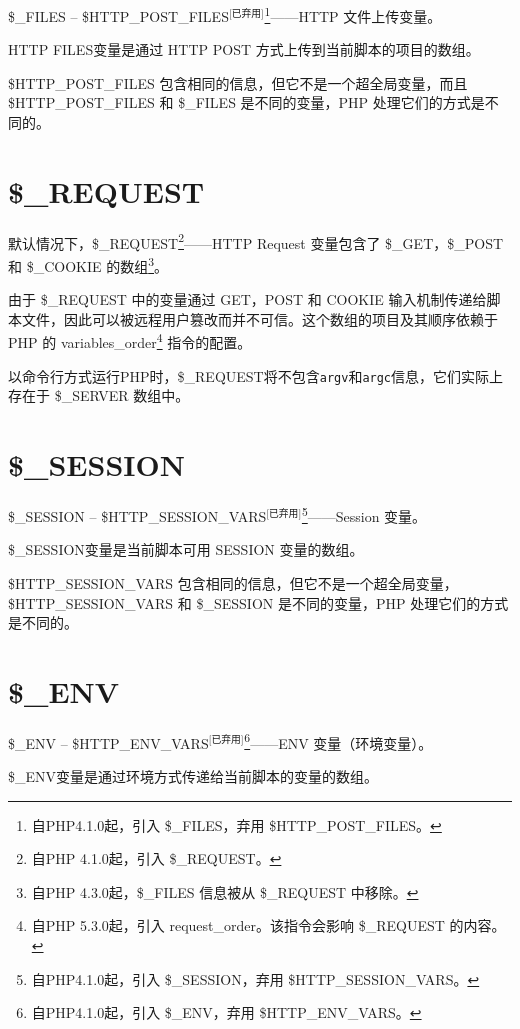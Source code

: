 \$\_FILES -- \$HTTP\_POST\_FILES$^{\text{[已弃用]}}$\footnote{自PHP4.1.0起，引入 \$\_FILES，弃用 \$HTTP\_POST\_FILES。}——HTTP 文件上传变量。

HTTP FILES变量是通过 HTTP POST 方式上传到当前脚本的项目的数组。

\$HTTP\_POST\_FILES 包含相同的信息，但它不是一个超全局变量，而且\$HTTP\_POST\_FILES 和 \$\_FILES 是不同的变量，PHP 处理它们的方式是不同的。


\section{\$\_REQUEST}


默认情况下，\$\_REQUEST\footnote{自PHP 4.1.0起，引入 \$\_REQUEST。}——HTTP Request 变量包含了 \$\_GET，\$\_POST 和 \$\_COOKIE 的数组\footnote{自PHP 4.3.0起，\$\_FILES 信息被从 \$\_REQUEST 中移除。}。

由于 \$\_REQUEST 中的变量通过 GET，POST 和 COOKIE 输入机制传递给脚本文件，因此可以被远程用户篡改而并不可信。这个数组的项目及其顺序依赖于 PHP 的 variables\_order\footnote{自PHP 5.3.0起，引入 request\_order。该指令会影响 \$\_REQUEST 的内容。} 指令的配置。

以命令行方式运行PHP时，\$\_REQUEST将不包含\texttt{argv}和\texttt{argc}信息，它们实际上存在于 \$\_SERVER 数组中。




\section{\$\_SESSION}


\$\_SESSION -- \$HTTP\_SESSION\_VARS$^{\text{[已弃用]}}$\footnote{自PHP4.1.0起，引入 \$\_SESSION，弃用 \$HTTP\_SESSION\_VARS。}——Session 变量。


\$\_SESSION变量是当前脚本可用 SESSION 变量的数组。

\$HTTP\_SESSION\_VARS 包含相同的信息，但它不是一个超全局变量，\$HTTP\_SESSION\_VARS 和 \$\_SESSION 是不同的变量，PHP 处理它们的方式是不同的。


\section{\$\_ENV}


\$\_ENV -- \$HTTP\_ENV\_VARS$^{\text{[已弃用]}}$\footnote{自PHP4.1.0起，引入 \$\_ENV，弃用 \$HTTP\_ENV\_VARS。}——ENV 变量（环境变量）。


\$\_ENV变量是通过环境方式传递给当前脚本的变量的数组。

